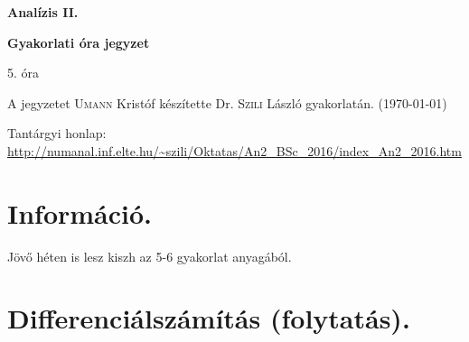 \documentclass[a4paper,11.5pt]{article}
\begin{document}
	\setlength\parindent{0pt}
	\def\s{\hspace{0.2mm}\vphantom{\beta}}
	\def\Z{\mathbb{Z}}
	\def\Q{\mathbb{Q}}
	\def\R{\mathbb{R}}
	\def\C{\mathbb{C}}
	\def\N{\mathbb{N}}
	\def\Rn{\mathbb{R}^{n}}
	\def\Ra{\overline{\mathbb{R}}}
	\def\sume{\displaystyle\sum_{n=1}^{+\infty}}
	\def\sumn{\displaystyle\sum_{n=0}^{+\infty}}
	\def\biz{\emph{Bizonyítás:\ }}
	\def\narrow{\underset{n\rightarrow+\infty}{\longrightarrow}}
	\def\limn{\displaystyle\lim_{n\to +\infty}}
	\def\limx{\displaystyle\lim_{x\to +\infty}}
	
	\theoremstyle{definition}
	\newtheorem{theorem}{Tétel}[subsection] %
	
	\theoremstyle{definition}
	\newtheorem{definition}[theorem]{Definíció} %
	\newtheorem{example}[theorem]{Példa} %
	\newtheorem{task}[theorem]{Feladat} %
	\newtheorem{note}[theorem]{Megjegyzés} %
	\newtheorem{revision}[theorem]{Emlékeztető} %
	\begin{center}
		{\LARGE \textbf{Analízis II.}}
		
		{\large \textbf{Gyakorlati óra jegyzet}}
		
		5. óra
	\end{center}
	A jegyzetet \textsc{Umann} Kristóf készítette Dr. \textsc{Szili} László gyakorlatán. (\today)
	
	Tantárgyi honlap: \url{http://numanal.inf.elte.hu/~szili/Oktatas/An2_BSc_2016/index_An2_2016.htm}
	
	\section{Információ.}
	Jövő héten is lesz kiszh az 5-6 gyakorlat anyagából.
	\section{Differenciálszámítás (folytatás).}
\end{document}
